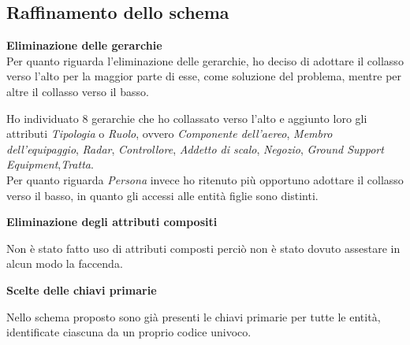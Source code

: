 
\newpage

\subsection{Raffinamento dello schema}

\textbf{Eliminazione delle gerarchie}\\
\textsf{\small Per quanto riguarda l'eliminazione delle gerarchie, ho deciso di adottare il collasso verso l'alto per la maggior parte di esse, come soluzione del problema, mentre per altre il collasso verso il basso.}\break 



\textsf{\small Ho individuato 8 gerarchie che ho collassato verso l'alto e aggiunto loro gli attributi \emph{Tipologia} o \emph{Ruolo}, ovvero \emph{Componente dell'aereo}, \emph{Membro dell'equipaggio}, \emph{Radar}, \emph{Controllore}, \emph{Addetto di scalo}, \emph{Negozio}, \emph{Ground Support Equipment},\emph{Tratta}.}\\

\textsf{\small Per quanto riguarda \emph{Persona} invece ho ritenuto più opportuno adottare il collasso verso il basso, in quanto gli accessi alle entità figlie sono distinti.}\break


\textbf{Eliminazione degli attributi compositi}

\textsf{\small Non è stato fatto uso di attributi composti perciò non è stato dovuto assestare in alcun modo la faccenda.}\break %

\textbf{Scelte delle chiavi primarie}

\textsf{\small Nello schema proposto sono già presenti le chiavi primarie per tutte le entità, identificate ciascuna da un proprio codice univoco.}\break

